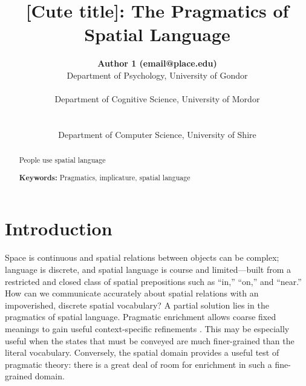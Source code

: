 \documentclass[10pt,letterpaper]{article}
\title{[Cute title]: The Pragmatics of Spatial Language}
\author{
{\large \bf Author 1 (email@place.edu)} \\
  Department of Psychology, University of Gondor\\
  \And{\large \bf Author 2 (email@place.edu)} \\
  Department of Cognitive Science, University of Mordor \\
  \\
 \AND{\large \bf Author 3 (email@people.edu)} \\
  Department of Computer Science, University of Shire\\
}
\newcommand{\ndg}[1]{\textcolor{Green}{[ndg: #1]}}
\begin{document}
\maketitle

\begin{abstract}
People use spatial language

\textbf{Keywords:} 
Pragmatics, implicature, spatial language
\end{abstract}

\section{Introduction}
Space is continuous and spatial relations between objects can be complex;
language is discrete, and spatial language is course and limited---built from a restricted and closed class of spatial prepositions \cite{talmy83,talmy00,landau93} such as ``in,'' ``on,'' and ``near.'' 
How can we communicate accurately about spatial relations with an impoverished, discrete spatial vocabulary?
A partial solution lies in the pragmatics of spatial language.
Pragmatic enrichment allows coarse fixed meanings to gain useful context-specific refinements \cite{grice75,horn84}.
This may be especially useful when the states that must be conveyed are much finer-grained than the literal vocabulary.
Conversely, the spatial domain provides a useful test of pragmatic theory: there is a great deal of room for enrichment in such a fine-grained domain.

%
\end{document}
